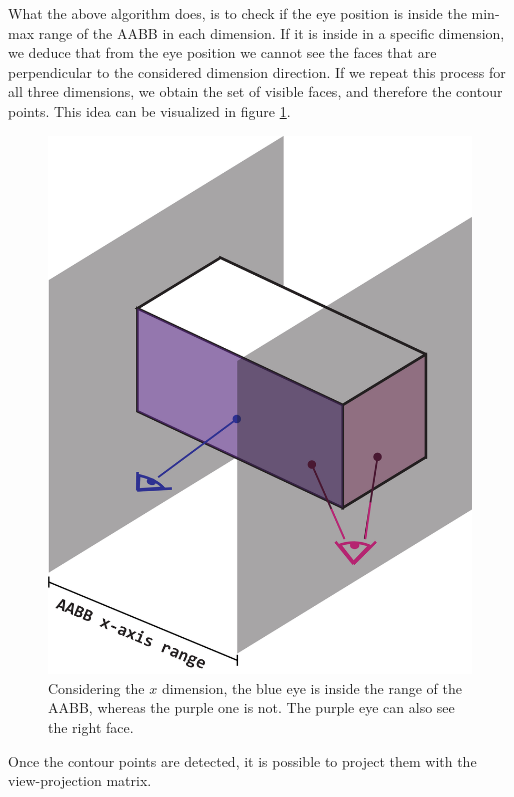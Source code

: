 \documentclass{PoliMi_MasterThesis}
\begin{document}
What the above algorithm does, is to check if the eye position is inside the min-max range of the AABB in each dimension. If it is inside in a specific dimension, we deduce that from the eye position we cannot see the faces that are perpendicular to the considered dimension direction. If we repeat this process for all three dimensions, we obtain the set of visible faces, and therefore the contour points. This idea can be visualized in figure \ref{fig:visible_faces_from_eye}.

\begin{figure}[H]
	\centering
	\includegraphics[width=\textwidth*\real{0.5}]{Images/aabb_view_hull.png}
	\caption{Considering the $x$ dimension, the blue eye is inside the range of the AABB, whereas the purple one is not. The purple eye can also see the right face.}
	\label{fig:visible_faces_from_eye}
\end{figure}

Once the contour points are detected, it is possible to project them with the view-projection matrix.
\end{document}
